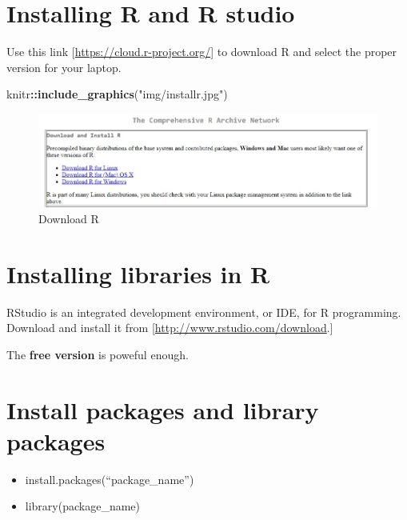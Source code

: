 \documentclass[]{book}
\newenvironment{Shaded}{\begin{snugshade}}{\end{snugshade}}
\newcommand{\KeywordTok}[1]{\textcolor[rgb]{0.13,0.29,0.53}{\textbf{#1}}}
\newcommand{\StringTok}[1]{\textcolor[rgb]{0.31,0.60,0.02}{#1}}
\newcommand{\OperatorTok}[1]{\textcolor[rgb]{0.81,0.36,0.00}{\textbf{#1}}}
\newcommand{\NormalTok}[1]{#1}
\begin{document}
\section{Installing R and R studio}\label{installing-r-and-r-studio}

Use this link {[}\url{https://cloud.r-project.org/}{]} to download R and
select the proper version for your laptop.

\begin{Shaded}
\begin{Highlighting}[]
\NormalTok{knitr}\OperatorTok{::}\KeywordTok{include_graphics}\NormalTok{(}\StringTok{"img/installr.jpg"}\NormalTok{)}
\end{Highlighting}
\end{Shaded}

\begin{figure}

{\centering \includegraphics[width=1\linewidth]{img/installr} 

}

\caption{Download R}\label{fig:nice-fig}
\end{figure}

\section{Installing libraries in R}\label{installing-libraries-in-r}

RStudio is an integrated development environment, or IDE, for R
programming. Download and install it from
{[}\url{http://www.rstudio.com/download}.{]}

The \textbf{free version} is poweful enough.

\section{Install packages and library
packages}\label{install-packages-and-library-packages}

\begin{itemize}
\item
  install.packages(``package\_name'')
\item
  library(package\_name)
\end{itemize}
\end{document}
